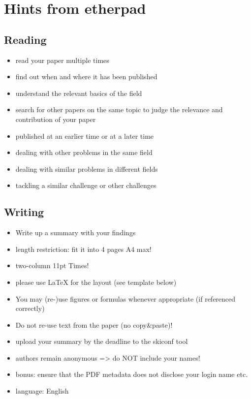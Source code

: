 \section{Hints from etherpad}
	\subsection{Reading}

	\begin{itemize}
		\item read your paper multiple times
	   \item find out when and where it has been published
	   \item understand the relevant basics of the field
	   \item search for other papers on the same topic to judge the relevance and contribution of your paper
	     \item published at an earlier time or at a later time
	     \item dealing with other problems in the same field
	     \item dealing with similar problems in different fields
	     \item tackling a similar challenge or other challenges
	\end{itemize}

\subsection{Writing}

\begin{itemize}
	\item Write up a summary with your findings
   \item length restriction: fit it into 4 pages A4 max!
   \item two-column 11pt Times!
   \item please use LaTeX for the layout (see template below)

   \item You may (re-)use figures or formulas whenever appropriate (if referenced correctly)
   \item Do not re-use text from the paper (no copy\&paste)!

   \item upload your summary by the deadline to the skiconf tool
     \item authors remain anonymous => do NOT include your names!
     \item bonus: ensure that the PDF metadata does not disclose your login name etc.
   \item language: English
\end{itemize}

